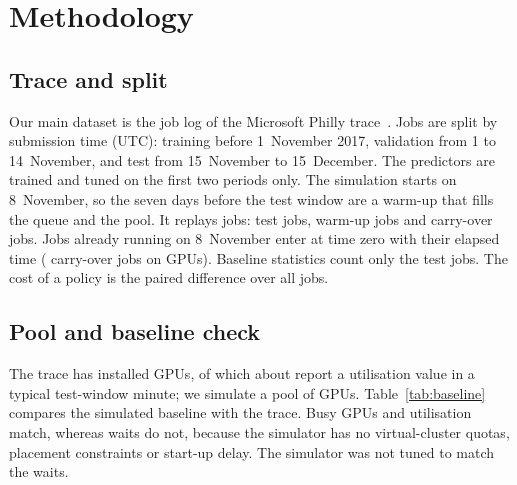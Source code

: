 \section{Methodology}
\label{sec:method}

\subsection{Trace and split}
Our main dataset is the job log of the Microsoft Philly trace~\cite{jeon19}. Jobs are split by submission time (UTC): training before 1~November 2017, validation from 1 to 14~November, and test from 15~November to 15~December. The predictors are trained and tuned on the first two periods only.
The simulation starts on 8~November, so the seven days before the test window are a warm-up that fills the queue and the pool. It replays \MethSimJobs{} jobs: \MotTestJobs{} test jobs, \MethWarmupJobs{} warm-up jobs and \MethCarryJobs{} carry-over jobs. Jobs already running on 8~November enter at time zero with their elapsed time (\MethCarryJobs{} carry-over jobs on \MethCarryGpus{} GPUs).
Baseline statistics count only the \MotTestJobs{} test jobs. The cost of a policy is the paired difference over all jobs.

\subsection{Pool and baseline check}
The trace has \SetupInstalledGpus{} installed GPUs, of which about \SetupPoolGpus{} report a utilisation value in a typical test-window minute; we simulate a pool of \SetupPoolGpus{} GPUs.
Table~\ref{tab:baseline} compares the simulated baseline with the trace. Busy GPUs and utilisation match, whereas waits do not, because the simulator has no virtual-cluster quotas, placement constraints or start-up delay. The simulator was not tuned to match the waits.


